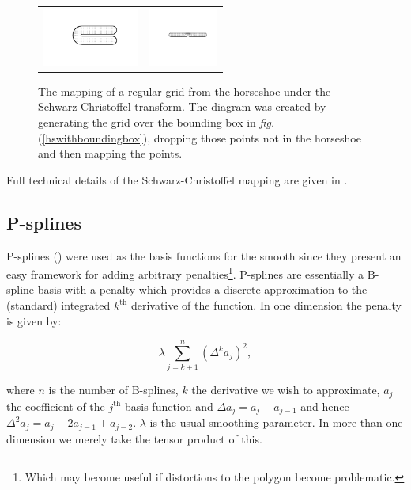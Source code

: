 \documentclass[a4paper,10pt]{amsart}
\newcommand{\sch}{Schwarz-Christoffel }
\newcommand{\fig}[1]{\emph{fig.} (\ref{#1})}
\begin{document}
\begin{figure}
\centering
\begin{tabular}{cc}
\includegraphics[height=0.75in, trim=1in 1in 0in 0.75in]{figs/hsgridmapping-1} & \includegraphics[height=0.75in, trim=1in 1in 0in 0.75in]{figs/hsgridmapping-2} \\
\end{tabular}
\caption{The mapping of a regular grid from the horseshoe under the \sch transform. The diagram was created by generating the grid over the bounding box in \fig{hswithboundingbox}, dropping those points not in the horseshoe and then mapping the points.}
\label{hsgridmapping}
\end{figure}

Full technical details of the \sch mapping are given in \cite{miller08}.


\subsection{P-splines}
P-splines (\cite{eilersmarx96}) were used as the basis functions for the smooth since they present an easy framework for adding arbitrary penalties\footnote{Which may become useful if distortions to the polygon become problematic.}. P-splines are essentially a B-spline basis with a penalty which provides a discrete approximation to the (standard) integrated $k^\text{th}$ derivative of the function. In one dimension the penalty is given by:

\begin{equation*}
\lambda \sum_{j=k+1}^n (\Delta^k a_j)^2,
\end{equation*}

where $n$ is the number of B-splines, $k$ the derivative we wish to approximate, $a_j$ the coefficient of the $j^\text{th}$ basis function and $\Delta a_j = a_j-a_{j-1}$ and hence $\Delta^2 a_j = a_j-2a_{j-1}+a_{j-2}$. $\lambda$ is the usual smoothing parameter. In more than one dimension we merely take the tensor product of this. 
\end{document}
